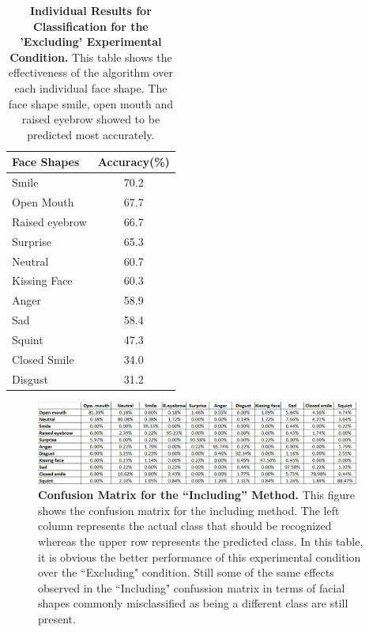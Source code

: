 \documentclass[]{article}
\begin{document}
\begin{table}[t]
\centering
\begin{tabular}{|l|c|}
\hline
Face Shapes & Accuracy(\%) \\ \hline
Smile & 70.2\\ \hline
Open Mouth & 67.7\\\hline
Raised eyebrow & 66.7\\\hline
Surprise & 65.3\\\hline
Neutral & 60.7\\\hline
Kissing Face & 60.3\\\hline
Anger & 58.9\\\hline
Sad & 58.4\\\hline
Squint & 47.3\\\hline
Closed Smile & 34.0\\\hline
Disgust & 31.2\\\hline
\end{tabular}
\caption{\textbf{Individual Results for Classification for the 'Excluding'
Experimental Condition.} This table shows the effectiveness of the algorithm over each individual face
shape. The face shape smile, open mouth and raised eyebrow showed to be predicted most accurately.}
\label{rankEx}
\end{table}




\begin{figure}[ht]
\begin{center}
\vspace{-3mm}
\includegraphics[width=0.95\textwidth]{figures/confusionIncluding.jpg}
\end{center}
\caption{\textbf{Confusion Matrix for the ``Including'' Method.} This figure 
shows the confusion matrix for the including method. The left column represents 
the actual class that should be recognized whereas the upper row represents the 
predicted class. In this table, it is obvious the better performance of this experimental condition over the
``Excluding" condition. Still some of the same effects observed in the ``Including" confussion matrix in terms of
facial shapes commonly misclassified as being a different class are still present.}
\label{coIncluding}
\end{figure}
\end{document}
